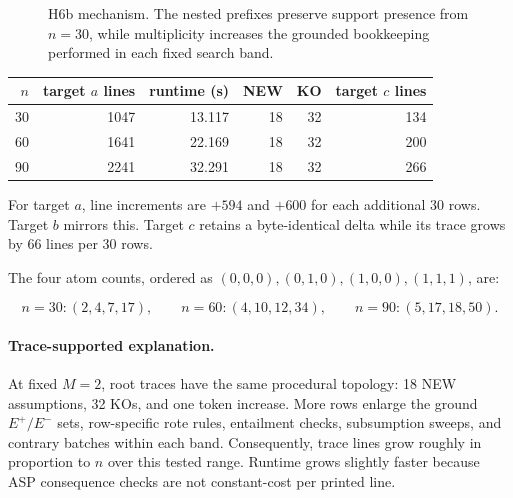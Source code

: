 \documentclass[11pt]{article}
\newcommand{\Epos}{E^{+}}
\newcommand{\Eneg}{E^{-}}
\newcommand{\explanation}{\paragraph{Trace-supported explanation.}}
\begin{document}
\begin{figure}[ht]
\centering
{}
\caption{H6b mechanism. The nested prefixes preserve support presence from
\(n=30\), while multiplicity increases the grounded bookkeeping performed in
each fixed search band.}
\label{fig:n-scaling}
\end{figure}

\begin{center}
\small
\begin{tabular}{rrrrrr}
\toprule
\(n\) & target \(a\) lines & runtime (s) & NEW & KO & target \(c\) lines \\
\midrule
30 & 1047 & 13.117 & 18 & 32 & 134 \\
60 & 1641 & 22.169 & 18 & 32 & 200 \\
90 & 2241 & 32.291 & 18 & 32 & 266 \\
\bottomrule
\end{tabular}
\end{center}

For target \(a\), line increments are \(+594\) and \(+600\) for each additional
30 rows. Target \(b\) mirrors this. Target \(c\) retains a byte-identical delta
while its trace grows by 66 lines per 30 rows.

The four atom counts, ordered as
\((0,0,0),(0,1,0),(1,0,0),(1,1,1)\), are:

\[
  n=30: (2,4,7,17),\qquad
  n=60: (4,10,12,34),\qquad
  n=90: (5,17,18,50).
\]

\explanation
At fixed \(M=2\), root traces have the same procedural topology: 18 NEW
assumptions, 32 KOs, and one token increase. More rows enlarge the ground
\(\Epos/\Eneg\) sets, row-specific rote rules, entailment checks, subsumption
sweeps, and contrary batches within each band. Consequently, trace lines grow
roughly in proportion to \(n\) over this tested range. Runtime grows slightly
faster because ASP consequence checks are not constant-cost per printed line.
\end{document}

